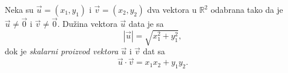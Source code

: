 \documentclass[11pt]{article}
\newcommand{\R}{\mathbb{R}}
\begin{document}
	\noindent
	Neka su $ \vec{u} = (x_1, y_1) $ i $ \vec{v} = (x_2, y_2) $ dva vektora u $ \R^2 $ odabrana tako da je
	$ \vec{u} \neq \vec{0} $ i $ \vec{v} \neq \vec{0} $. Du\v zina vektora $ \vec{u} $ data je sa
	\begin{equation*}
		|\vec{u}| = \sqrt{x^2_1 + y^2_1},
	\end{equation*}
	dok je \emph{skalarni proizvod vektora} $ \vec{u} $ i $ \vec{v} $ dat sa
	\begin{equation*}
		\vec{u} \cdot \vec{v} = x_1 x_2 + y_1 y_2.
	\end{equation*}
\end{document}

